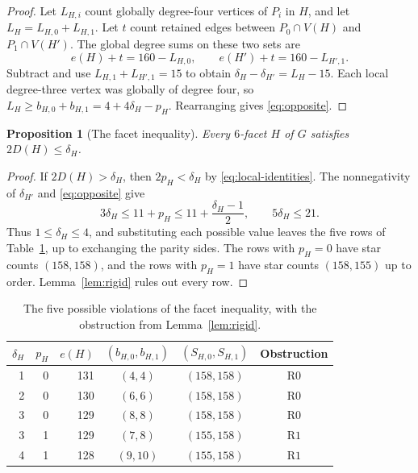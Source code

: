 \documentclass[11pt,reqno]{amsart}
\numberwithin{equation}{section}
\newtheorem{proposition}[theorem]{Proposition}
\begin{document}
\begin{proof}
Let \(L_{H,i}\) count globally degree-four vertices of \(P_i\)
in \(H\), and let \(L_H=L_{H,0}+L_{H,1}\). Let \(t\) count
retained edges between \(P_0\cap V(H)\) and \(P_1\cap V(H')\).
The global degree sums on these two sets are
\[
  e(H)+t=160-L_{H,0},
  \qquad e(H')+t=160-L_{H',1}.
\]
Subtract and use \(L_{H,1}+L_{H',1}=15\) to obtain
\(\delta_H-\delta_{H'}=L_H-15\).
Each local degree-three vertex was globally of degree four, so
\(L_H\ge b_{H,0}+b_{H,1}=4+4\delta_H-p_H\).
Rearranging gives \eqref{eq:opposite}.
\end{proof}

\begin{proposition}[The facet inequality]\label{prop:facet}
Every \(6\)-facet \(H\) of \(G\) satisfies \(2D(H)\le\delta_H\).
\end{proposition}

\begin{proof}
If \(2D(H)>\delta_H\), then \(2p_H<\delta_H\) by
\eqref{eq:local-identities}. The nonnegativity of \(\delta_{H'}\)
and \eqref{eq:opposite} give
\[
  3\delta_H\le11+p_H\le11+\frac{\delta_H-1}{2},
  \qquad 5\delta_H\le21 .
\]
Thus \(1\le\delta_H\le4\), and substituting each possible value
leaves the five rows of Table~\ref{tab:profiles}, up to exchanging
the parity sides. The rows with \(p_H=0\) have star counts
\((158,158)\), and the rows with \(p_H=1\) have star counts
\((158,155)\) up to order. Lemma~\ref{lem:rigid} rules out every row.
\end{proof}

\begin{table}[H]
\centering
\small
\begin{tabular}{@{}rrrccc@{}}
\toprule
\(\delta_H\) & \(p_H\) & \(e(H)\) &
\((b_{H,0},b_{H,1})\) & \((S_{H,0},S_{H,1})\) & Obstruction\\
\midrule
1 & 0 & 131 & \((4,4)\) & \((158,158)\) & \(\mathrm{R0}\)\\
2 & 0 & 130 & \((6,6)\) & \((158,158)\) & \(\mathrm{R0}\)\\
3 & 0 & 129 & \((8,8)\) & \((158,158)\) & \(\mathrm{R0}\)\\
3 & 1 & 129 & \((7,8)\) & \((155,158)\) & \(\mathrm{R1}\)\\
4 & 1 & 128 & \((9,10)\) & \((155,158)\) & \(\mathrm{R1}\)\\
\bottomrule
\end{tabular}
\caption{The five possible violations of the facet inequality, with
the obstruction from Lemma~\ref{lem:rigid}.}\label{tab:profiles}
\end{table}
\end{document}
